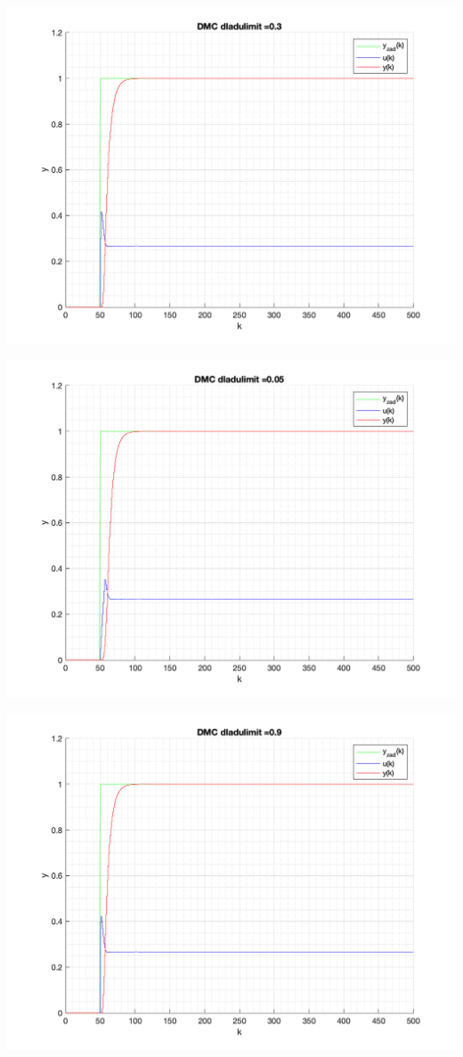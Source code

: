 \documentclass[a4paper, 11pt]{article}
\begin{document}
\begin{enumerate}
\begin{itemize}
 \includegraphics[width=\linewidth]{./ModelsP6_dulimit/P4_DMC_dulimit_0_3_png.png} 

 \includegraphics[width=\linewidth]{./ModelsP6_dulimit/P4_DMC_dulimit_0_05_png.png} 
 
 \includegraphics[width=\linewidth]{./ModelsP6_dulimit/P4_DMC_dulimit_0_9_png.png} 


\end{itemize}
\end{enumerate}
\end{document}
